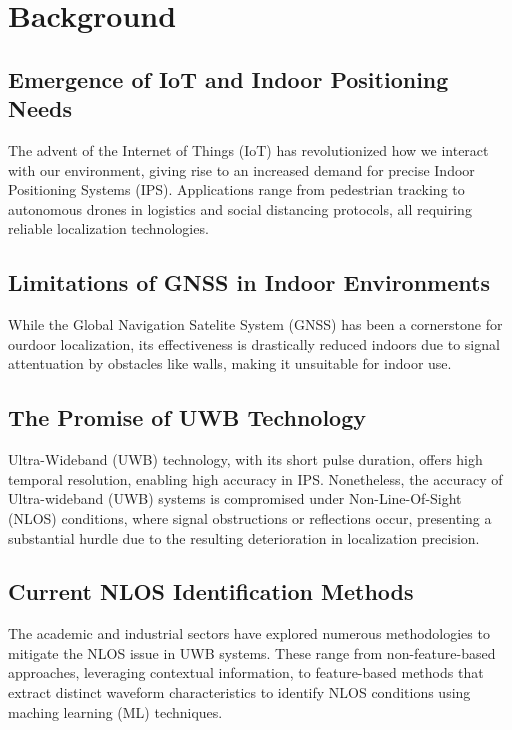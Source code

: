 \section{Background}\label{background}

\subsection{Emergence of IoT and Indoor Positioning Needs}\label{Emergence of IoT and Indoor Positioning Needs}
The advent of the Internet of Things (IoT) has revolutionized how we interact with our environment, giving rise to an increased demand for precise Indoor Positioning Systems (IPS). Applications range from pedestrian tracking to autonomous drones in logistics and social distancing protocols, all requiring reliable localization technologies.

\subsection{Limitations of GNSS in Indoor Environments}\label{Limitations of GNSS in Indoor Environments}
While the Global Navigation Satelite System (GNSS) has been a cornerstone for ourdoor localization, its effectiveness is drastically reduced indoors due to signal attentuation by obstacles like walls, making it unsuitable for indoor use.

\subsection{The Promise of UWB Technology}\label{The Promise of UWB Technology}
Ultra-Wideband (UWB) technology, with its short pulse duration, offers high temporal resolution, enabling high accuracy in IPS. Nonetheless, the accuracy of Ultra-wideband (UWB) systems is compromised under Non-Line-Of-Sight (NLOS) conditions, where signal obstructions or reflections occur, presenting a substantial hurdle due to the resulting deterioration in localization precision.

\subsection{Current NLOS Identification Methods}\label{Current NLOS Identification Methods}
The academic and industrial sectors have explored numerous methodologies to mitigate the NLOS issue in UWB systems. These range from non-feature-based approaches, leveraging contextual information, to feature-based methods that extract distinct waveform characteristics to identify NLOS conditions using maching learning (ML) techniques.

